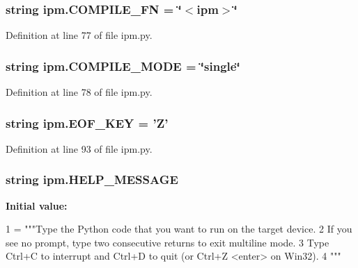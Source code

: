 \hypertarget{namespaceipm_a3c5a936d77b7f60346b7c6fe0f2ba4e0}{
\subsubsection[{C\-O\-M\-P\-I\-L\-E\-\_\-\-F\-N}]{\setlength{\rightskip}{0pt plus 5cm}string ipm.\-C\-O\-M\-P\-I\-L\-E\-\_\-\-F\-N = \char`\"{}$<$ipm$>$\char`\"{}}}\label{namespaceipm_a3c5a936d77b7f60346b7c6fe0f2ba4e0}


Definition at line 77 of file ipm.\-py.

\hypertarget{namespaceipm_a1746c35e97fcf4778889715399402bbe}{
\subsubsection[{C\-O\-M\-P\-I\-L\-E\-\_\-\-M\-O\-D\-E}]{\setlength{\rightskip}{0pt plus 5cm}string ipm.\-C\-O\-M\-P\-I\-L\-E\-\_\-\-M\-O\-D\-E = \char`\"{}single\char`\"{}}}\label{namespaceipm_a1746c35e97fcf4778889715399402bbe}


Definition at line 78 of file ipm.\-py.

\hypertarget{namespaceipm_a0465adf46dd0d7a5c190c1535a0cf3e1}{
\subsubsection[{E\-O\-F\-\_\-\-K\-E\-Y}]{\setlength{\rightskip}{0pt plus 5cm}string ipm.\-E\-O\-F\-\_\-\-K\-E\-Y = 'Z'}}\label{namespaceipm_a0465adf46dd0d7a5c190c1535a0cf3e1}


Definition at line 93 of file ipm.\-py.

\hypertarget{namespaceipm_a55cc54b8c403a86c6a5e921e50dbfef3}{
\subsubsection[{H\-E\-L\-P\-\_\-\-M\-E\-S\-S\-A\-G\-E}]{\setlength{\rightskip}{0pt plus 5cm}string ipm.\-H\-E\-L\-P\-\_\-\-M\-E\-S\-S\-A\-G\-E}}\label{namespaceipm_a55cc54b8c403a86c6a5e921e50dbfef3}
{\bfseries Initial value\-:}
\begin{DoxyCode}
1 = \textcolor{stringliteral}{"""Type the Python code that you want to run on the target device.}
2 \textcolor{stringliteral}{If you see no prompt, type two consecutive returns to exit multiline mode.}
3 \textcolor{stringliteral}{Type Ctrl+C to interrupt and Ctrl+D to quit (or Ctrl+Z <enter> on Win32).}
4 \textcolor{stringliteral}{"""}
\end{DoxyCode}


